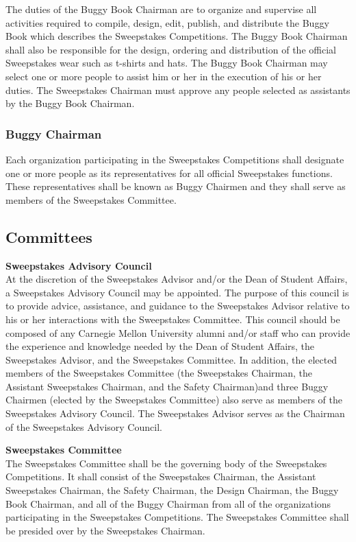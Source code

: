 \documentclass[openany]{book}
\begin{document}
The duties of the Buggy Book Chairman are to organize and supervise all activities required to compile, design, edit, publish, and distribute the Buggy Book which describes the Sweepstakes Competitions. The Buggy Book Chairman shall also be responsible for the design, ordering and distribution of the official Sweepstakes wear such as t-shirts and hats. The Buggy Book Chairman may select one or more people to assist him or her in the execution of his or her duties. The Sweepstakes Chairman must approve any people selected as assistants by the Buggy Book Chairman.

\subsubsection{Buggy Chairman}
Each organization participating in the Sweepstakes Competitions shall designate one or more people as its representatives for all official Sweepstakes functions. These representatives shall be known as Buggy Chairmen and they shall serve as members of the Sweepstakes Committee.

\subsection{Committees}

\textbf{Sweepstakes Advisory Council}\\
At the discretion of the Sweepstakes Advisor and/or the Dean of Student Affairs, a Sweepstakes Advisory Council may be appointed. The purpose of this council is to provide advice, assistance, and guidance to the Sweepstakes Advisor relative to his or her interactions with the Sweepstakes Committee. This council should be composed of any Carnegie Mellon University alumni and/or staff who can provide the experience and knowledge needed by the Dean of Student Affairs, the Sweepstakes Advisor, and the Sweepstakes Committee. In addition, the elected members of the Sweepstakes Committee (the Sweepstakes Chairman, the Assistant Sweepstakes Chairman, and the Safety Chairman)and three Buggy Chairmen (elected by the Sweepstakes Committee) also serve as members of the Sweepstakes Advisory Council. The Sweepstakes Advisor serves as the Chairman of the Sweepstakes Advisory Council.

\textbf{Sweepstakes Committee}\\
The Sweepstakes Committee shall be the governing body of the Sweepstakes Competitions. It shall consist of the Sweepstakes Chairman, the Assistant Sweepstakes Chairman, the Safety Chairman, the Design Chairman, the Buggy Book Chairman, and all of the Buggy Chairman from all of the organizations participating in the Sweepstakes Competitions. The Sweepstakes Committee shall be presided over by the Sweepstakes Chairman.
\end{document}
